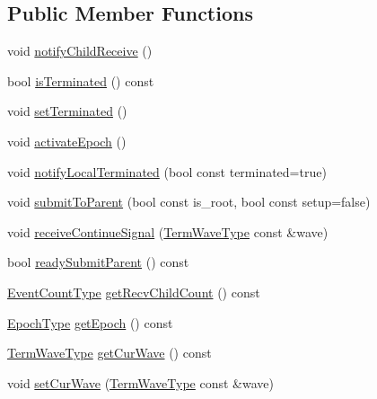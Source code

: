 \subsection*{Public Member Functions}
\begin{DoxyCompactItemize}
\item 
void \hyperlink{structvt_1_1term_1_1_term_state_a15191c2002809d73cd7f6d4c1a22b480}{notify\+Child\+Receive} ()
\item 
bool \hyperlink{structvt_1_1term_1_1_term_state_a3effc7cc47eb94edac12091aea044b02}{is\+Terminated} () const
\item 
void \hyperlink{structvt_1_1term_1_1_term_state_abcf1c80b28edf803367d9c047fd52bf7}{set\+Terminated} ()
\item 
void \hyperlink{structvt_1_1term_1_1_term_state_af18ed55a5c5b685b655e84aabd4d3d9c}{activate\+Epoch} ()
\item 
void \hyperlink{structvt_1_1term_1_1_term_state_a6b18d41b5a88a20e5231c236c996cfff}{notify\+Local\+Terminated} (bool const terminated=true)
\item 
void \hyperlink{structvt_1_1term_1_1_term_state_a3419f0c92e9b3d1ba7665f46c88f5526}{submit\+To\+Parent} (bool const is\+\_\+root, bool const setup=false)
\item 
void \hyperlink{structvt_1_1term_1_1_term_state_a9bf44783fc04e0e27056dfdc5eb0bc5a}{receive\+Continue\+Signal} (\hyperlink{namespacevt_1_1term_a4af17606966b2b5a6cba523bc39095a3}{Term\+Wave\+Type} const \&wave)
\item 
bool \hyperlink{structvt_1_1term_1_1_term_state_aed97f2a61356cf7230d38e06b999f019}{ready\+Submit\+Parent} () const
\item 
\hyperlink{structvt_1_1term_1_1_term_state_a900fe4e9d98c81a320ae1dca27b71c2c}{Event\+Count\+Type} \hyperlink{structvt_1_1term_1_1_term_state_a9d9eb29f1af45d4287b9535f33f14363}{get\+Recv\+Child\+Count} () const
\item 
\hyperlink{namespacevt_a81d11b28122d43bf9834577e4a06440f}{Epoch\+Type} \hyperlink{structvt_1_1term_1_1_term_state_a081ea661cb484ab14804dcd027a2d136}{get\+Epoch} () const
\item 
\hyperlink{namespacevt_1_1term_a4af17606966b2b5a6cba523bc39095a3}{Term\+Wave\+Type} \hyperlink{structvt_1_1term_1_1_term_state_a240b60d4d683179af84ab72e5d2092e9}{get\+Cur\+Wave} () const
\item 
void \hyperlink{structvt_1_1term_1_1_term_state_ac2ec8452c3f502107c79a17d8c9c75b7}{set\+Cur\+Wave} (\hyperlink{namespacevt_1_1term_a4af17606966b2b5a6cba523bc39095a3}{Term\+Wave\+Type} const \&wave)

\end{DoxyCompactItemize}
